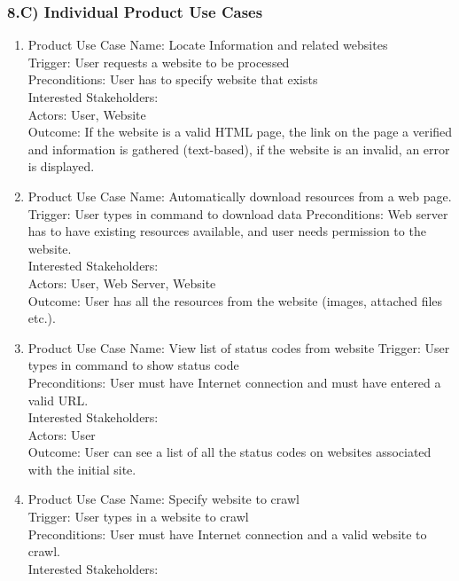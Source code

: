 \documentclass[12pt]{article}
\begin{document}
\subsubsection{8.C) Individual Product Use Cases  }
\begin{enumerate}
  \item  Product Use Case Name: Locate Information and related websites \\
  Trigger: User requests a website to be processed \\
Preconditions: User has to specify website that exists\\
Interested Stakeholders: \\
Actors: User, Website\\
Outcome: If the website is a valid HTML page, the link on the page a verified and information is gathered (text-based), if the website is an invalid, an error is displayed.\\
  \item Product Use Case Name: Automatically download resources from a web page.\\
  Trigger: User types in command to download data
Preconditions: Web server has to have existing resources available, and user needs permission to the website.\\
Interested Stakeholders: \\
Actors: User, Web Server, Website\\
Outcome: User has all the resources from the website (images, attached files etc.).\\
  \item Product Use Case Name: View list of status codes from website
  Trigger: User types in command to show status code\\
Preconditions: User must have Internet connection and must have entered a valid URL.\\
Interested Stakeholders: \\
Actors: User\\
Outcome: User can see a list of all the status codes on websites associated with the initial site.\\
  \item Product Use Case Name: Specify website to crawl\\
Trigger: User types in a website to crawl\\
Preconditions: User must have Internet connection and a valid website to crawl.\\
Interested Stakeholders:\\

\end{enumerate}
\end{document}
